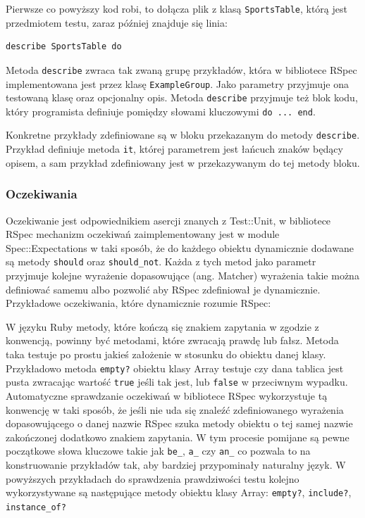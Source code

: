     
    
    Pierwsze co powyższy kod robi, to dołącza plik z klasą \texttt{SportsTable}, którą jest przedmiotem testu, zaraz później znajduje się linia:
    
\begin{lstlisting}
describe SportsTable do
\end{lstlisting}
    
    Metoda \texttt{describe} zwraca tak zwaną grupę przykładów, która w bibliotece RSpec implementowana jest przez klasę \texttt{ExampleGroup}. Jako parametry przyjmuje ona testowaną klasę oraz opcjonalny opis. Metoda \texttt{describe} przyjmuje też blok kodu, który programista definiuje pomiędzy słowami kluczowymi \texttt{do ... end}.
    
    Konkretne przykłady zdefiniowane są w bloku przekazanym do metody \texttt{describe}. Przykład definiuje metoda \texttt{it}, której parametrem jest łańcuch znaków będący opisem, a sam przykład zdefiniowany jest w przekazywanym do tej metody bloku.
    
    \subsubsection{Oczekiwania}
    Oczekiwanie jest odpowiednikiem asercji znanych z Test::Unit, w bibliotece RSpec mechanizm oczekiwań zaimplementowany jest w module Spec::Expectations w taki sposób, że do każdego obiektu dynamicznie dodawane są metody \texttt{should} oraz \texttt{should\_not}. Każda z tych metod jako parametr przyjmuje kolejne wyrażenie dopasowujące (ang. Matcher) wyrażenia takie można definiować samemu albo pozwolić aby RSpec zdefiniował je dynamicznie. Przykładowe oczekiwania, które dynamicznie rozumie RSpec:
    
    
    
    W języku Ruby metody, które kończą się znakiem zapytania w zgodzie z konwencją, powinny być metodami, które zwracają prawdę lub fałsz. Metoda taka testuje po prostu jakieś założenie w stosunku do obiektu danej klasy. Przykładowo metoda \texttt{empty?} obiektu klasy Array testuje czy dana tablica jest pusta zwracając wartość \texttt{true} jeśli tak jest, lub \texttt{false} w przeciwnym wypadku. Automatyczne sprawdzanie oczekiwań w bibliotece RSpec wykorzystuje tą konwencję w taki sposób, że jeśli nie uda się znaleźć zdefiniowanego wyrażenia dopasowującego o danej nazwie RSpec szuka metody obiektu o tej samej nazwie zakończonej dodatkowo znakiem zapytania. W tym procesie pomijane są pewne początkowe słowa kluczowe takie jak \texttt{be\_}, \texttt{a\_} czy \texttt{an\_} co pozwala to na konstruowanie przykładów tak, aby bardziej przypominały naturalny język. W powyższych przykładach do sprawdzenia prawdziwości testu kolejno wykorzystywane są następujące metody obiektu klasy Array: \verb+empty?+, \verb+include?+, \verb+instance_of?+
    
